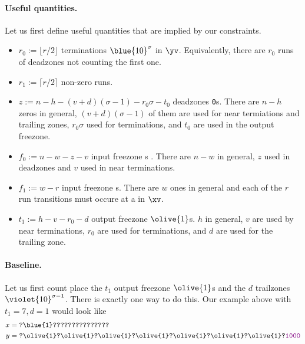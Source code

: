 \paragraph{Useful quantities.}
Let us first define useful quantities that are implied by our constraints.
\begin{itemize}
  \item $r_0:=\lfloor r/2\rfloor$ terminations $\blue{10}^\sigma$ in $\yv$. Equivalently, there are $r_0$ runs of deadzones not counting the first one.
  \item $r_1:=\lceil r/2\rceil$ non-zero runs.
  \item $z:=n-h-(v+d)(\sigma -1)-r_0\sigma -t_0$  deadzones \texttt{0}s. There are $n-h$ zeros in general, $(v+d)(\sigma -1)$ of them are used for near termiations and trailing zones, $r_0\sigma$ used for terminations, and $t_0$ are used in the output freezone.
  \item $f_0:=n-w-z-v$ input freezone s . There are $n-w$ in general, $z$ used in deadzones and $v$ used in near terminations.
  \item $f_1:=w-r$ input freezone s. There are $w$ ones in general and each of the $r$ run transitions must occure at a  in $\xv$.
  \item $t_1:=h-v-r_0-d$ output freezone $\olive{1}$s. $h$ in general, $v$ are used by near terminations, $r_0$ are used for terminations, and $d$ are used for the trailing zone.
\end{itemize}

\paragraph{Baseline.}

Let us first count place the $t_1$  output freezone $\olive{1}$s  and the $d$ trailzones $\violet{10}^{\sigma-1}$. There is exactly one way to do this. Our example above with $t_1=7,d=1$ would look like
\begin{align*}
  x&=\texttt{?\blue{1}???????????????}\\
  y&=\texttt{?\olive{1}?\olive{1}?\olive{1}?\olive{1}?\olive{1}?\olive{1}?\olive{1}?\textcolor{violet}{1000}}
\end{align*}

